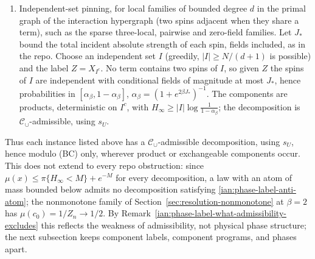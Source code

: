 \begin{enumerate}
\item Independent-set pinning, for local families of bounded degree
\(d\) in the primal graph of the interaction hypergraph (two spins
adjacent when they share a term), such as the sparse three-local,
pairwise and zero-field families. Let \(J_*\) bound the total incident
absolute strength of each spin, fields included, as in the repo. Choose
an independent set \(I\) (greedily, \(|I|\ge N/(d+1)\) is possible) and
the label \(Z=X_{I^c}\). No term contains two spins of \(I\), so given \(Z\) the
spins of \(I\) are independent with conditional fields of magnitude at
most \(J_*\), hence probabilities in
\([\alpha_\beta,1-\alpha_\beta]\), \(\alpha_\beta=(1+e^{2\beta J_*})^{-1}\).
The components are products, deterministic on \(I^c\), with
\(H_\infty\ge|I|\log\frac1{1-\alpha_\beta}\); the decomposition is
\(\mathcal C_\cup\)-admissible, using \(s_U\).
\end{enumerate}

Thus each instance listed above has a \(\mathcal C_\cup\)-admissible
decomposition, using \(s_U\), hence modulo (BC) only, wherever product
or exchangeable components occur. This does not extend to every repo
obstruction: since \(\mu(x)\le\pi\{H_\infty<M\}+e^{-M}\) for every
decomposition, a law with an atom of mass bounded below admits no
decomposition satisfying \eqref{ian:phase-label-anti-atom}; the
nonmonotone family of Section~\ref{sec:resolution-nonmonotone} at
\(\beta=2\) has \(\mu(c_0)=1/Z_n\to1/2\). By Remark~\ref{ian:phase-label-what-admissibility-excludes}
this reflects the weakness of admissibility, not physical phase
structure; the next subsection keeps component labels, component
programs, and phases apart.
